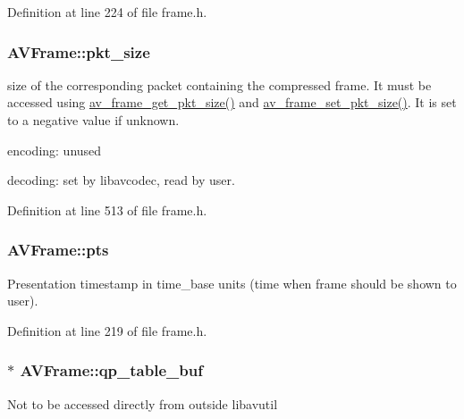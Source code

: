Definition at line 224 of file frame.\+h.

\subsubsection[{\texorpdfstring{pkt\+\_\+size}{pkt_size}}]{ A\+V\+Frame\+::pkt\+\_\+size}\hypertarget{struct_a_v_frame_a3cc73a3345ec1ff8e473ab6049c607e7}{}\label{struct_a_v_frame_a3cc73a3345ec1ff8e473ab6049c607e7}
size of the corresponding packet containing the compressed frame. It must be accessed using \hyperlink{group__lavu__frame_ga03e2090721bb5d66f292090c7e7e2524}{av\+\_\+frame\+\_\+get\+\_\+pkt\+\_\+size()} and \hyperlink{group__lavu__frame_ga12742a052df91eeb22a0062cf3da0504}{av\+\_\+frame\+\_\+set\+\_\+pkt\+\_\+size()}. It is set to a negative value if unknown.
\begin{DoxyItemize}
\item encoding\+: unused
\item decoding\+: set by libavcodec, read by user. 
\end{DoxyItemize}

Definition at line 513 of file frame.\+h.

\subsubsection[{\texorpdfstring{pts}{pts}}]{ A\+V\+Frame\+::pts}\hypertarget{struct_a_v_frame_a0452833e3ab6ddd7acbf82817a7818a4}{}\label{struct_a_v_frame_a0452833e3ab6ddd7acbf82817a7818a4}
Presentation timestamp in time\+\_\+base units (time when frame should be shown to user). 

Definition at line 219 of file frame.\+h.

\subsubsection[{\texorpdfstring{qp\+\_\+table\+\_\+buf}{qp_table_buf}}]{$\ast$ A\+V\+Frame\+::qp\+\_\+table\+\_\+buf}\hypertarget{struct_a_v_frame_ae7899bbbb38ef9da9e99f36fa69939cc}{}\label{struct_a_v_frame_ae7899bbbb38ef9da9e99f36fa69939cc}
Not to be accessed directly from outside libavutil 

